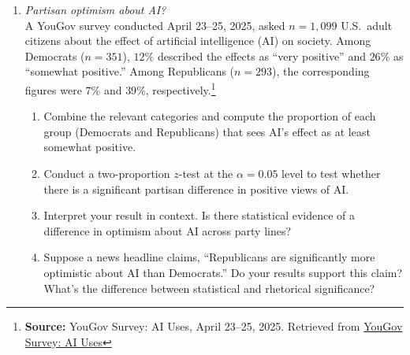 \documentclass{article}
\begin{document}
\begin{enumerate}
    \begin{enumerate}[label=(\alph*)]
    \item One question found that 52\% of respondents said they do not personally know anyone who is an illegal immigrant. How should we interpret the margin of error in this context? What interval captures the plausible range for this percentage in the U.S. adult population at the 95\% confidence level? \footnote{Remember to account for the found design effect ($DEFF$) on the $SE(\hat{p})$ in the previous question, when you compute the $SE$ for $\hat{p}=0.52$.}
    \item Does the reported margin of error apply to all values in the poll (e.g., subgroups like “men under 30”)? Why or why not?
    \item What margin of error do you expect for subgroups in the sample with few respondents compared to the reported margin of error? A larger, similar, or smaller one? Why?
    \item Suppose the margin of error were larger—say, $\pm 5\%$. What could cause that, and how would it affect our conclusions about close issues or public opinion trends?
    \item Why is the margin of error not the only source of uncertainty in interpreting poll results?
    \end{enumerate}

\item  \emph{Partisan optimism about AI?} \\
      A YouGov survey conducted April 23–25, 2025, asked $n = 1{,099}$ U.S.\ adult citizens about the effect of artificial intelligence (AI) on society. Among Democrats ($n = 351$), $12\%$ described the effects as “very positive” and $26\%$ as “somewhat positive.” Among Republicans ($n = 293$), the corresponding figures were $7\%$ and $39\%$, respectively.\footnote{\textbf{Source:} YouGov Survey: AI Uses, April 23–25, 2025. Retrieved from \href{https://d3nkl3psvxxpe9.cloudfront.net/documents/AI_Uses_poll_results.pdf}{YouGov Survey: AI Uses}}

      \begin{enumerate}[label=(\alph*)]
         \item Combine the relevant categories and compute the proportion of each group (Democrats and Republicans) that sees AI’s effect as at least somewhat positive.
         \item Conduct a two-proportion $z$-test at the $\alpha = 0.05$ level to test whether there is a significant partisan difference in positive views of AI.
         \item Interpret your result in context. Is there statistical evidence of a difference in optimism about AI across party lines?
         \item Suppose a news headline claims, “Republicans are significantly more optimistic about AI than Democrats.” Do your results support this claim? What’s the difference between statistical and rhetorical significance?
      \end{enumerate}

\end{enumerate}
\end{document}
